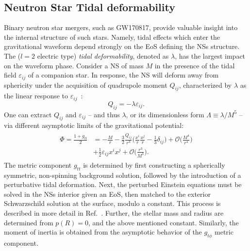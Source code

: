 \documentclass[prd,twocolumn,nofootinbib,superscriptaddress,amsmath,amssymb]{revtex4-1}
\begin{document}
\subsection{Neutron Star Tidal deformability}\label{tidal}
Binary neutron star mergers, such as GW170817, provide valuable insight into the internal structure of such stars. 
Namely, tidal effects which enter the gravitational waveform depend strongly on the EoS defining the NSs structure. 
The ($l=2$ electric type) \emph{tidal deformability}, denoted as $\lambda$, has the largest impact on the waveform phase. 
Consider a NS of mass $M$ in the presence of the tidal field $\varepsilon_{ij}$ of a companion star.
In response, the NS will deform away from sphericity under the acquisition of quadrupole moment $Q_{ij}$, characterized by $\lambda$ as the linear response to $\varepsilon_{ij}$~\cite{Flanagan2008,hinderer-love,Yagi2013}:
\begin{equation}
Q_{ij}=-\lambda \varepsilon_{ij}.
\end{equation}
One can extract $Q_{ij}$ and $\varepsilon_{ij}$ -- and thus $\lambda$, or its dimensionless form $\Lambda \equiv \lambda/M^5$ -- via different asymptotic limits of the gravitational potential:
\begin{align}
\begin{split}
\Phi=\frac{1+g_{tt}}{2}&=-\frac{M}{r} - \frac{3}{2}\frac{Q_{ij}}{r^3} \Bigg(\frac{x^i}{r} \frac{x^j}{r}-\frac{1}{3}\delta_{ij} \Bigg) + \mathcal{O} \Bigg( \frac{M^4}{r^4} \Bigg)\\
&+ \frac{1}{2} \varepsilon_{ij} x^i x^j + \mathcal{O} \Bigg( \frac{r^3}{M^3} \Bigg).
\end{split}
\end{align}
The metric component $g_{tt}$ is determined by first constructing a spherically symmetric, non-spinning background solution, followed by the introduction of a perturbative tidal deformation.
Next, the perturbed Einstein equations must be solved in the NSs interior given an EoS, then matched to the exterior Schwarzschild solution at the surface, modulo a constant.
This process is described in more detail in Ref.~\cite{hinderer-love}.
Further, the stellar mass and radius are determined from $p(R)=0$, and the above mentioned constant.
Similarly, the moment of inertia is obtained from the asymptotic behavior of the $g_{t \phi}$ metric component.
\end{document}
